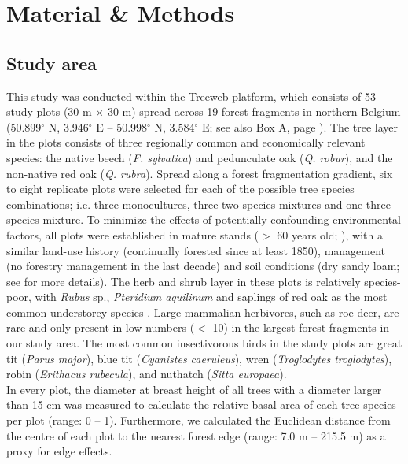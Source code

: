 \documentclass[10pt, twoside]{book} %
\begin{document}
\clearpage
	\section{Material \& Methods}
	
		\subsection*{Study area}
		
		This study was conducted within the Treeweb platform, which consists of 53 study plots (30 m $\times$ 30 m) spread across 19 forest fragments in northern Belgium (50.899$^{\circ}$ N, 3.946$^{\circ}$ E -- 50.998$^{\circ}$ N, 3.584$^{\circ}$ E; see also Box A, page \pageref{boxa}). The tree layer in the plots consists of three regionally common and economically relevant species: the native beech (\textit{F. sylvatica}) and pedunculate oak (\textit{Q. robur}), and the non-native red oak (\textit{Q. rubra}). Spread along a forest fragmentation gradient, six to eight replicate plots were selected for each of the possible tree species combinations; i.e. three monocultures, three two-species mixtures and one three-species mixture. To minimize the effects of potentially confounding environmental factors, all plots were established in mature stands ($>$ 60 years old; \citealt{DeGroote2018}), with a similar land-use history (continually forested since at least 1850), management (no forestry management in the last decade) and soil conditions (dry sandy loam; see \citealt{DeGroote2017} for more details). The herb and shrub layer in these plots is relatively species-poor, with \textit{Rubus} sp., \textit{Pteridium aquilinum} and saplings of red oak as the most common understorey species \citep{DeGroote2017}. Large mammalian herbivores, such as roe deer, are rare and only present in low numbers ($<$ 10) in the largest forest fragments in our study area. The most common insectivorous birds in the study plots are great tit (\textit{Parus major}), blue tit (\textit{Cyanistes caeruleus}), wren (\textit{Troglodytes troglodytes}), robin (\textit{Erithacus rubecula}), and nuthatch (\textit{Sitta europaea}).\\
		
		In every plot, the diameter at breast height of all trees with a diameter larger than 15 cm was measured to calculate the relative basal area of each tree species per plot (range: 0 -- 1). Furthermore, we calculated the Euclidean distance from the centre of each plot to the nearest forest edge (range: 7.0 m -- 215.5 m) as a proxy for edge effects.\\
		
\end{document}
